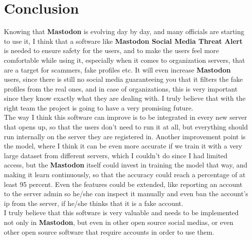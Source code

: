 \chapter{Conclusion}
\label{ch:sum}

Knowing that \textbf{Mastodon} is evolving day by day, and many officials are starting to use it, I think that a software
like \textbf{Mastodon Social Media Threat Alert} is needed to ensure safety for the users, and to make the users feel more
comfortable while using it, especially when it comes to organization servers, that are a target for scammers, fake profiles etc.
It will even increase \textbf{Mastodon} users, since there is still no social media guaranteeing you that it filters the fake profiles
from the real ones, and in case of organizations, this is very important since they know exactly what they are dealing with.
I truly believe that with the right team the project is going to have a very promising future.
\\[5pt]
The way I think this software can improve is to be integrated in every new server that opens up, so that the users don't
need to run it at all, but everything should run internally on the server they are registered in.
Another improvement point is the model, where I think it can be even more accurate if we train it with a very large dataset from
different servers, which I couldn't do since I had limited access, but the \textbf{Mastodon} itself could invest in training the
model that way, and making it learn continuously, so that the accuracy could reach a percentage of at least 95 percent.
Even the features could be extended, like reporting an account to the server admin so he/she can inspect it manually and even ban the
account's ip from the server, if he/she thinks that it is a fake account.
\\[5pt]
I truly believe that this software is very valuable and needs to be implemented not only in \textbf{Mastodon}, but even in
other open source social medias, or even other open source software that require accounts in order to use them.
